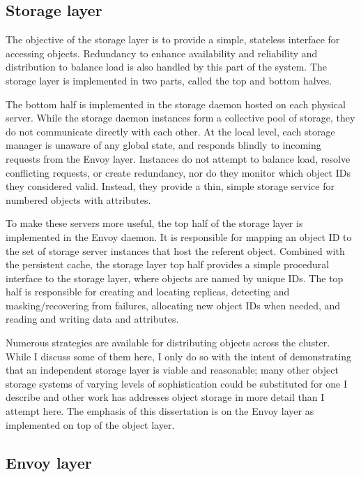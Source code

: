 \subsection{Storage layer}

The objective of the storage layer is to provide a simple, stateless interface for accessing objects. Redundancy to enhance availability and reliability and distribution to balance load is also handled by this part of the system. The storage layer is implemented in two parts, called the top and bottom halves.

The bottom half is implemented in the storage daemon hosted on each physical server. While the storage daemon instances form a collective pool of storage, they do not communicate directly with each other. At the local level, each storage manager is unaware of any global state, and responds blindly to incoming requests from the Envoy layer. Instances do not attempt to balance load, resolve conflicting requests, or create redundancy, nor do they monitor which object IDs they considered valid. Instead, they provide a thin, simple storage service for numbered objects with attributes.

To make these servers more useful, the top half of the storage layer is implemented in the Envoy daemon. It is responsible for mapping an object ID to the set of storage server instances that host the referent object. Combined with the persistent cache, the storage layer top half provides a simple procedural interface to the storage layer, where objects are named by unique IDs. The top half is responsible for creating and locating replicas, detecting and masking/recovering from failures, allocating new object IDs when needed, and reading and writing data and attributes.

Numerous strategies are available for distributing objects across the cluster. While I discuss some of them here, I only do so with the intent of demonstrating that an independent storage layer is viable and reasonable; many other object storage systems of varying levels of sophistication could be substituted for one I describe and other work has addresses object storage in more detail than I attempt here. The emphasis of this dissertation is on the Envoy layer as implemented on top of the object layer.

\subsection{Envoy layer}

